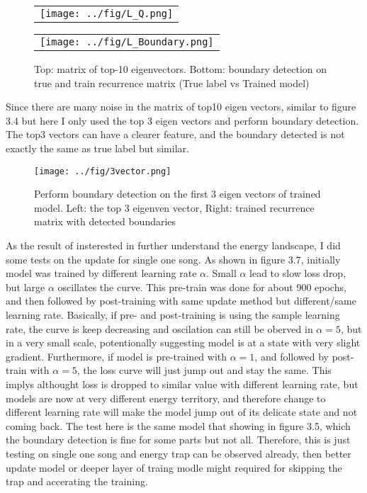 \documentclass[final]{siamltexmm}
\begin{document}
\begin{figure}[H]
\centering
\begin{subfigure}
  \begin{tabular}{c}
  \texttt{[image: ../fig/L\_Q.png]}
  \end{tabular}{}
\end{subfigure}
  \begin{tabular}{c}
  \texttt{[image: ../fig/L\_Boundary.png]}
  \end{tabular}{}
\begin{subfigure}
\end{subfigure}
\caption{Top: matrix of top-10 eigenvectors. Bottom: boundary detection on true and train recurrence matrix (True label vs Trained model)}
\end{figure}
Since there are many noise in the matrix of top10 eigen vectors, similar to figure 3.4 but here I only used the top 3 eigen vectors and perform boundary detection. The top3 vectors can have a clearer feature, and the boundary detected is not exactly the same as true label but similar.
\begin{figure}[H]
  \centering
    \texttt{[image: ../fig/3vector.png]}
  \caption{Perform boundary detection on the first 3 eigen vectors of trained model. Left: the top 3 eigenven vector, Right: trained recurrence matrix with detected boundaries}
\end{figure}
As the result of insterested in further understand the energy landscape, I did some tests on the update for single one song. As shown in figure 3.7, initially model was trained by different learning rate $\alpha$. Small $\alpha$ lead to slow loss drop, but large $\alpha$ oscillates the curve. This pre-train was done for about 900 epochs, and then followed by post-training with same update method but different/same learning rate. Basically, if pre- and post-training is using the sample learning rate, the curve is keep decreasing and oscilation can still be oberved in $\alpha=5$, but in a very small scale, potentionally suggesting model is at a state with very slight gradient. Furthermore, if model is pre-trained with $\alpha=1$, and followed by post-train with $\alpha=5$, the loss curve will just jump out and stay the same. This implys althought loss is dropped to similar value with different learning rate, but models are now at very different energy territory, and therefore change to different learning rate will make the model jump out of its delicate state and not coming back. The test here is the same model that showing in figure 3.5, which the boundary detection is fine for some parts but not all. Therefore, this is just testing on single one song and energy trap can be observed already, then better update model or deeper layer of traing modle might required for skipping the trap and accerating the training.
\end{document}
